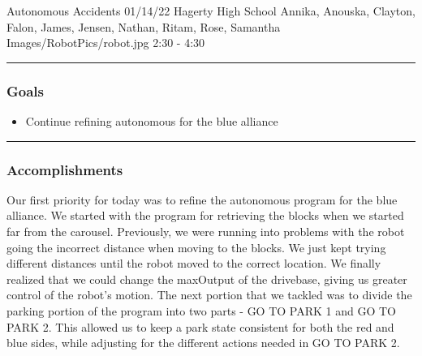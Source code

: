 \insertmeeting 
	{Autonomous Accidents} 
	{01/14/22} 
	{Hagerty High School}
	{Annika, Anouska, Clayton, Falon, James, Jensen, Nathan, Ritam, Rose, Samantha}
	{Images/RobotPics/robot.jpg}
	{2:30 - 4:30}
	
\noindent\hfil\rule{\textwidth}{.4pt}\hfil
\subsubsection*{Goals}
\begin{itemize}
    \item Continue refining autonomous for the blue alliance 

\end{itemize} 

\noindent\hfil\rule{\textwidth}{.4pt}\hfil

\subsubsection*{Accomplishments}
Our first priority for today was to refine the autonomous program for the blue alliance. We started with the program for retrieving the blocks when we started far from the carousel. Previously, we were running into problems with the robot going the incorrect distance when moving to the blocks. We just kept trying different distances until the robot moved to the correct location. We finally realized that we could change the maxOutput of the drivebase, giving us greater control of the robot's motion. The next portion that we tackled was to divide the parking portion of the program into two parts - GO TO PARK 1 and GO TO PARK 2. This allowed us to keep a park state consistent for both the red and blue sides, while adjusting for the different actions needed in GO TO PARK 2. 
 
